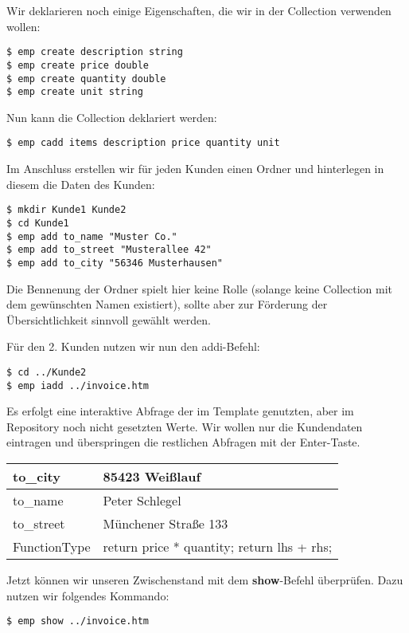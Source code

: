 Wir deklarieren noch einige Eigenschaften, die wir in der Collection verwenden wollen:

\begin{lstlisting}[style=Bash]
$ emp create description string
$ emp create price double
$ emp create quantity double
$ emp create unit string
\end{lstlisting}

Nun kann die Collection deklariert werden:

\begin{lstlisting}[style=Bash]
$ emp cadd items description price quantity unit
\end{lstlisting}

Im Anschluss erstellen wir für jeden Kunden einen Ordner und hinterlegen in diesem die Daten des Kunden:
\begin{lstlisting}[style=Bash]
$ mkdir Kunde1 Kunde2
$ cd Kunde1
$ emp add to_name "Muster Co."
$ emp add to_street "Musterallee 42"
$ emp add to_city "56346 Musterhausen"
\end{lstlisting}

Die Bennenung der Ordner spielt hier keine Rolle (solange keine Collection mit dem gewünschten Namen existiert), sollte aber zur Förderung der Übersichtlichkeit sinnvoll gewählt werden.

Für den 2. Kunden nutzen wir nun den addi-Befehl:
\begin{lstlisting}[style=Bash]
$ cd ../Kunde2
$ emp iadd ../invoice.htm
\end{lstlisting}

Es erfolgt eine interaktive Abfrage der im Template genutzten, aber im Repository noch nicht gesetzten Werte. Wir wollen nur die Kundendaten eintragen und überspringen die restlichen Abfragen mit der Enter-Taste.

\begin{tabular}{| l | l |}
	\hline
	to\_city & 85423 Weißlauf \\
	\hline
	to\_name & Peter Schlegel \\
	\hline
	to\_street & Münchener Straße 133 \\
	\hline
	FunctionType & \grqq return price * quantity; return lhs + rhs; \grqq\\
	\hline
\end{tabular}

Jetzt können wir unseren Zwischenstand mit dem \textbf{show}-Befehl überprüfen. Dazu nutzen wir folgendes Kommando:
\begin{lstlisting}[style=Bash]
$ emp show ../invoice.htm
\end{lstlisting}

